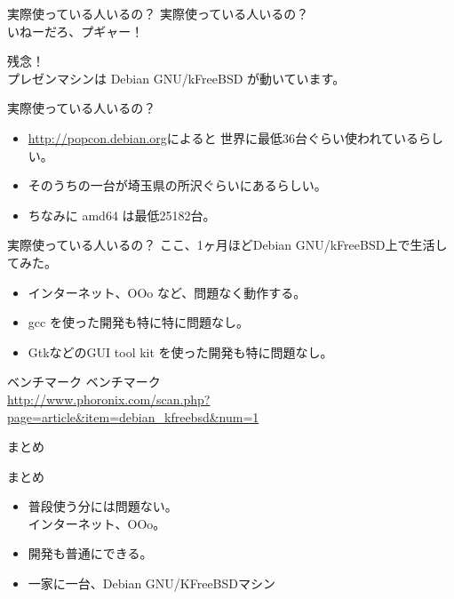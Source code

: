 \begin{frame}{実際使っている人いるの？}
実際使っている人いるの？ \\
\pause
いねーだろ、プギャー！\\
\pause
\begin{center}
\color{red}

残念！\\
プレゼンマシンは Debian GNU/kFreeBSD が動いています。
\end{center}
\end{frame}

\begin{frame}{実際使っている人いるの？}
\begin{itemize}

\item \url{http://popcon.debian.org}によると
世界に最低36台ぐらい使われているらしい。

\item そのうちの一台が埼玉県の所沢ぐらいにあるらしい。
\item ちなみに amd64 は最低25182台。
\end{itemize}

\end{frame}

\begin{frame}{実際使っている人いるの？}
ここ、1ヶ月ほどDebian GNU/kFreeBSD上で生活してみた。
\begin{itemize}
\item<1-> インターネット、OOo など、問題なく動作する。
\item<2-> gcc を使った開発も特に特に問題なし。
\item<3-> GtkなどのGUI tool kit を使った開発も特に問題なし。
\end{itemize}
\end{frame}

\begin{frame}{ベンチマーク}
ベンチマーク\\
\url{http://www.phoronix.com/scan.php?page=article\&item=debian_kfreebsd\&num=1}
\end{frame}

\begin{frame}{まとめ}

\end{frame}

\begin{frame}{まとめ}
\begin{itemize}
\item<1-> 普段使う分には問題ない。\\
インターネット、OOo。
\item<2-> 開発も普通にできる。\\
\item<3-> 一家に一台、Debian GNU/KFreeBSDマシン
\end{itemize}
\end{frame}


